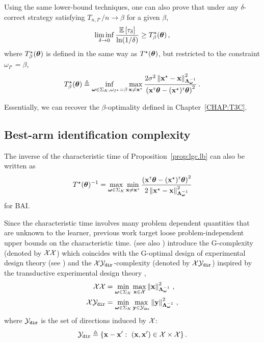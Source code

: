 \begin{remark}
\begin{leftbar}[remarkbar]
Using the same lower-bound techniques, one can also prove that under any $\delta$-correct strategy satisfying $T_{n,I^\star}/n \rightarrow \beta$ for a given $\beta$,
\[
    \liminf_{\delta \rightarrow 0}\frac{\mathbb{E}\left[\tau_\delta\right]}{\ln(1/\delta)} \geq T^\star_\beta({\boldsymbol \theta})\,,
\]
where $T^\star_\beta({\boldsymbol \theta})$ is defined in the same way as $T^\star({\boldsymbol \theta})$, but restricted to the constraint $\omega_{I^\star}=\beta$,
\[
    T^\star_{\beta}({\boldsymbol \theta}) \triangleq \inf_{{\boldsymbol \omega}\in\Sigma_K,\omega_{I^\star}=\beta}\max_{{\bf x}\neq {\bf x}^\star} \frac{2\sigma^2\left\lVert{\bf x}^\star - {\bf x}\right\rVert^2_{{\boldsymbol \Lambda}_{{\boldsymbol \omega}}^{-1}}}{\left({\bf x}^\mathsf{\scriptscriptstyle T}{\boldsymbol \theta}-({\bf x}^\star)^\mathsf{\scriptscriptstyle T}{\boldsymbol \theta}\right)^2}\,.
\]


Essentially, we can recover the $\beta$-optimality defined in Chapter~\ref{CHAP:T3C}.
\end{leftbar}
\end{remark}

\subsection{Best-arm identification complexity}\label{sec:lgc.complexity.complexity}

The inverse of the characteristic time of Proposition~\ref{prop:lgc.lb} can also be written as
\[
    T^{\star}({\boldsymbol \theta})^{-1} = \max_{{\boldsymbol \omega}\in\Sigma_K} \min_{{\bf x}\neq {\bf x}^\star} \frac{\left({\bf x}^\mathsf{\scriptscriptstyle T}{\boldsymbol \theta}-({\bf x}^\star)^\mathsf{\scriptscriptstyle T}{\boldsymbol \theta}\right)^2}{2\left\lVert{\bf x}^\star - {\bf x}\right\rVert^2_{{\boldsymbol \Lambda}_{{\boldsymbol \omega}}^{-1}}}
\]
for BAI.

Since the characteristic time involves many problem dependent quantities that are unknown to the learner, previous work target loose problem-independent upper bounds on the characteristic time. \citet{soare2014linear} (see also \citealt{tao2018alba,fiez2019transductive}) introduce the G-complexity (denoted by $\mathcal{X}\mathcal{X}$) which coincides with the G-optimal design of experimental design theory (see \citealt{pukelsheim2006optimal}) and the $\mathcal{X}\mathcal{Y}_{\texttt{dir}}$-complexity (denoted by $\mathcal{X}\mathcal{Y}_{\texttt{dir}}$) inspired by the transductive experimental design theory  \citep{yu2006active},
\begin{align*}
    \mathcal{X}\mathcal{X} &=\min_{{\boldsymbol \omega}\in\Sigma_K} \max_{{\bf x}\in\mathcal{X}} \left\lVert{\bf x}\right\rVert_{{\boldsymbol \Lambda}_{{\boldsymbol \omega}}^{-1}}^2\,,\\
    \mathcal{X}\mathcal{Y}_{\texttt{dir}} &=\min_{{\boldsymbol \omega}\in\Sigma_K} \max_{{\bf y}\in\mathcal{Y}_{\texttt{dir}}} \left\lVert{\bf y}\right\rVert_{{\boldsymbol \Lambda}_{{\boldsymbol \omega}}^{-1}}^2\,,
\end{align*}
where $\mathcal{Y}_{\texttt{dir}}$ is the set of directions induced by $\mathcal{X}$:
\[
\cY_{\texttt{dir}}\eqdef\{\bx-\bx':\ (\bx,\bx')\in\cX\times\cX\}\,.
\]

